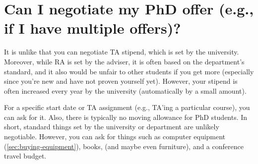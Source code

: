 \documentclass[oneside,11pt,dvipsnames]{book}
\begin{document}
\section{Can I negotiate my PhD offer (e.g., if I have multiple offers)?}\label{sec:negotiate}

It is unlike that you can negotiate TA stipend, which is set by the university. Moreover, while RA is set by the adviser, it is often based on the department's standard, and it also would be unfair to other students if you get more (especially since you're new and have not proven yourself yet). However, your stipend is often increased every year by the university (automatically by a small amount).

For a specific start date or TA assignment (e.g., TA'ing a particular course), you can ask for it. Also, there is typically no moving allowance for PhD students. In short, standard things set by the university or department are unlikely negotiable.  However, you can ask for things such as computer equipment (\autoref{sec:buying-equipment}), books, (and maybe even furniture), and a conference travel budget.



\appendix




\end{document}
